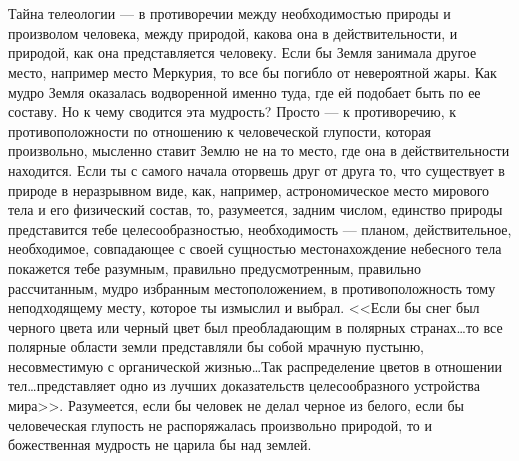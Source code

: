 \documentclass[12pt]{article}
\begin{document}
\section{}

Тайна телеологии --- в противоречии между необходимостью природы и произволом человека, между природой, какова она в действительности, и природой, как она представляется человеку. Если бы Земля занимала другое место, например место Меркурия, то все бы погибло от невероятной жары. Как мудро Земля оказалась водворенной именно туда, где ей подобает быть по ее составу. Но к чему сводится эта мудрость? Просто --- к противоречию, к противоположности по отношению к человеческой глупости, которая произвольно, мысленно ставит Землю не на то место, где она в действительности находится. Если ты с самого начала оторвешь друг от друга то, что существует в природе в неразрывном виде, как, например, астрономическое место мирового тела и его физический состав, то, разумеется, задним числом, единство природы представится тебе целесообразностью, необходимость --- планом, действительное, необходимое, совпадающее с своей сущностью местонахождение небесного тела покажется тебе разумным, правильно предусмотренным, правильно рассчитанным, мудро избранным местоположением, в противоположность тому неподходящему месту, которое ты измыслил и выбрал. <<Если бы снег был черного цвета или черный цвет был преобладающим в полярных странах\dots то все полярные области земли представляли бы собой мрачную пустыню, несовместимую с органической жизнью\dots Так распределение цветов в отношении тел\dots представляет одно из лучших доказательств целесообразного устройства мира>>. Разумеется, если бы человек не делал черное из белого, если бы человеческая глупость не распоряжалась произвольно природой, то и божественная мудрость не царила бы над землей.


\section{}
\end{document}
